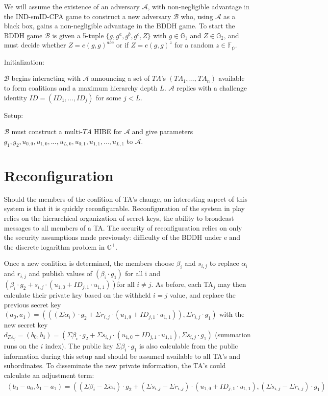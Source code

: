 \documentclass[10pt]{article}
\newcommand{\A}{\mathcal{A}}
\newcommand{\B}{\mathcal{B}}
\newcommand{\TA}{\mathit{TA}}
\begin{document}
We will assume the existence of an adversary $\A$, with non-negligible advantage in the IND-smID-CPA game to construct a new adversary $\B$ who, using $\A$ as a black box, gains a non-negligible advantage in the BDDH game. To start the BDDH game $\B$ is given a 5-tuple $\{g, g^a, g^b, g^c, Z\}$ with $g \in \mathbb{G}_1$ and $Z \in \mathbb{G}_2$, and must decide whether $Z = e(g,g)^{abc}$ or if $Z = e(g,g)^z$ for a random $z \in \mathbb{F_p}$.

Initialization:

$\B$ begins interacting with $\A$ announcing a set of $\TA$'s $(\TA_1, ..., \TA_n)$ available to form coalitions and a maximum hierarchy depth $L$.  $\A$ replies with a challenge identity $ID = (ID_1, ..., ID_j)$ for some $j < L$.

Setup:

$\B$ must construct a multi-$\TA$ HIBE for $\A$ and give parameters $g_1, g_2, u_{0,0}, u_{1,0}, ..., u_{L,0}, u_{0,1}, u_{1,1}, ..., u_{L,1}$ to $\A$.  

\section*{Reconfiguration}

Should the members of the coalition of TA's change, an interesting aspect of this system is that it is quickly reconfigurable.  Reconfiguration of the system in play relies on the hierarchical organization of secret keys, the ability to broadcast messages to all members of a TA.  The security of reconfiguration relies on only the security assumptions made previously: difficulty of the BDDH under e and the discrete logarithm problem in $\mathbb{G}^+$.
 
Once a new coalition is determined, the members choose $\beta_i$ and $s_{i,j}$ to replace $\alpha_i$ and $r_{i,j}$ and publish values of $(\beta_i \cdot g_1)$ for all i and $(\beta_i \cdot g_2 + s_{i,j} \cdot (u_{1,0} + ID_{j,1}\cdot u_{1,1}))$for all $i \neq j$.  As before, each TA$_j$ may then calculate their private key based on the withheld $i = j$ value, and replace the previous secret key $(a_0, a_1) = (((\Sigma \alpha_i)\cdot g_2 + \Sigma r_{i,j} \cdot (u_{1,0} + ID_{j,1}\cdot u_{1,1})), \Sigma r_{i,j} \cdot g_1)$ with the new secret key $d_{TA_j} = (b_0, b_1) = (\Sigma \beta_i \cdot g_2
 + \Sigma s_{i,j} \cdot (u_{1,0} + ID_{j,1}\cdot u_{1,1}), \Sigma s_{i,j} \cdot g_1)$ (summation runs on the $i$ index). The public key $\Sigma \beta_i \cdot g_1$ is also calculable from the public information during this setup and should be assumed available to all TA's and subordinates.   To disseminate the new private information, the TA's could calculate an adjustment term:
\begin{align*}
(b_0 - a_0, b_1 - a_1) = ((\Sigma \beta_i - \Sigma \alpha_i) \cdot g_2 + (\Sigma s_{i,j} - \Sigma r_{i,j})\cdot (u_{1,0} + ID_{j,1} \cdot u_{1,1}), (\Sigma s_{i,j} - \Sigma r_{i,j})\cdot g_1)
\end{align*}
\end{document}
